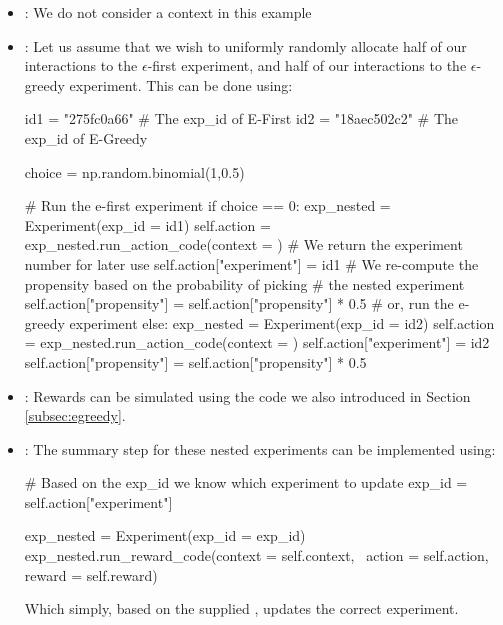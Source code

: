 \documentclass[nojss]{jss}
\begin{document}
\begin{itemize}
\item {}: We do not consider a context in this example
\item {}: Let us assume that we wish to uniformly randomly allocate half of our interactions to the $\epsilon$-first experiment, and half of our interactions to the $\epsilon$-greedy experiment. This can be done using:
\begin{Code}
id1 = "275fc0a66" # The exp_id of E-First
id2 = "18aec502c2" # The exp_id of E-Greedy

choice = np.random.binomial(1,0.5)

# Run the e-first experiment
if choice == 0:
    exp_nested = Experiment(exp_id = id1)
    self.action = exp_nested.run_action_code(context = {})
    # We return the experiment number for later use
    self.action["experiment"] = id1
    # We re-compute the propensity based on the probability of picking
    # the nested experiment
    self.action["propensity"] = self.action["propensity"] * 0.5
# or, run the e-greedy experiment
else: 
    exp_nested = Experiment(exp_id = id2)
    self.action = exp_nested.run_action_code(context = {})
    self.action["experiment"] = id2
    self.action["propensity"] = self.action["propensity"] * 0.5
\end{Code}

\item {}: Rewards can be simulated using the code we also introduced in Section \ref{subsec:egreedy}.

\item {}: The summary step for these nested experiments can be implemented using:
\begin{Code}
# Based on the exp_id we know which experiment to update
exp_id = self.action["experiment"]

exp_nested = Experiment(exp_id = exp_id)
exp_nested.run_reward_code(context = self.context, \
  action = self.action, reward = self.reward)
\end{Code}
Which simply, based on the supplied , updates the correct experiment.
\end{itemize}
\end{document}
